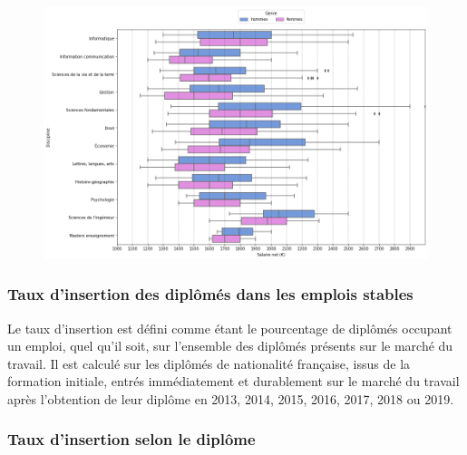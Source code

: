 \documentclass[12pt, a4paper, titlepage, table]{article}
\begin{document}
	\begin{figure}[H]
		\centering
		\includegraphics[width=1\textwidth]{../graphs/boxplot_salaire_discipline.png}
		\label{fig:boxplot_salaire_discipline}
	\end{figure}

	\subsubsection{Taux d'insertion des diplômés dans les emplois stables}

Le taux d’insertion est défini comme étant le pourcentage de diplômés occupant un emploi, quel qu’il soit, sur l’ensemble des diplômés présents sur le marché du travail. Il est calculé sur les diplômés de nationalité française, issus de la formation initiale, entrés immédiatement et durablement sur le marché du travail après l’obtention de leur diplôme en 2013, 2014, 2015, 2016, 2017, 2018 ou 2019.

	\subsubsection{Taux d'insertion selon le diplôme}
		
\end{document}
